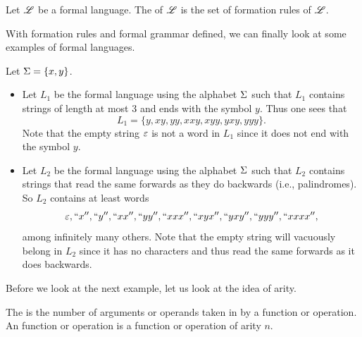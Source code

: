 \begin{definition}
    Let $\mathscr{L}$ be a formal language. The  of $\mathscr{L}$ is the set of formation rules of $\mathscr{L}$.
\end{definition}

With formation rules and formal grammar defined, we can finally look at some examples of formal languages.

\begin{example}
    Let $\Sigma = \{x,y\}$.
    \begin{itemize}[leftmargin=*]
        \item Let $L_1$ be the formal language using the alphabet $\Sigma$ such that $L_1$ contains strings of length at most 3 and ends with the symbol $y$. Thus one sees that
        \[
            L_1 = \{y, xy, yy, xxy, xyy, yxy, yyy\}.
        \]
        Note that the empty string $\varepsilon$ is not a word in $L_1$ since it does not end with the symbol $y$.

        \item Let $L_2$ be the formal language using the alphabet $\Sigma$ such that $L_2$ contains strings that read the same forwards as they do backwards (i.e., palindromes). So $L_2$ contains at least words
        \[
            \varepsilon, ``x'', ``y'', ``xx'', ``yy'', ``xxx'', ``xyx'', ``yxy'', ``yyy'', ``xxxx'',
        \]
        among infinitely many others. Note that the empty string will vacuously belong in $L_2$ since it has no characters and thus read the same forwards as it does backwards.
    \end{itemize}
\end{example}

Before we look at the next example, let us look at the idea of arity.

\begin{definition}[Arity]
    The  is the number of arguments or operands taken in by a function or operation. An  function or operation is a function or operation of arity $n$.
\end{definition}

